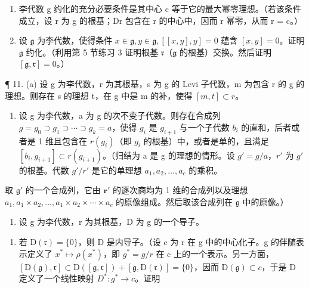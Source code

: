 \begin{enumerate}
\def\labelenumi{\arabic{enumi}.}
\setcounter{enumi}{8}
\item
  李代数 g 约化的充分必要条件是其中心 c 等于它的最大幂零理想。（若该条件成立，设 r 为 g 的根基；Dr 包含在 r 的中心中，因而 r 幂零，从而 r = c。）
\item
  设 \(\mathfrak{g}\) 为李代数，使得条件 \(x \in \mathfrak{g}, y \in \mathfrak{g}, [[x, y], y] = 0\) 蕴含 \([x, y] = 0\)。证明 \(\mathfrak{g}\) 约化。（利用第 5 节练习 3 证明根基 \(\mathfrak{r}\)（\(\mathfrak{g}\) 的根基）交换。然后证明 \([\mathfrak{g}, \mathfrak{r}] = 0\)。）
\end{enumerate}

¶ 11. (a) 设 g 为李代数，r 为其根基，s 为 g 的 Levi 子代数，m 为包含 r 的 g 的理想。则存在 s 的理想 t，在 g 中是 m 的补，使得 \([m, t] \subset r\)。

\begin{enumerate}
\def\labelenumi{(\alph{enumi})}
\setcounter{enumi}{1}
\tightlist
\item
  设 g 为李代数，a 为 g 的次不变子代数。则存在合成列 \(g = g_{0} \supset g_{1} \supset \cdots \supset g_{k} = a\)，使得 \(g_{i}\) 是 \(g_{i+1}\) 与一个子代数 \(b_{i}\) 的直和，后者或者是 1 维且包含在 \(r(g_{i})\)（即 \(g_{i}\) 的根基）中，或者是单的，且满足 \([b_{i}, g_{i+1}] \subset r(g_{i+1})\)。（归结为 a 是 g 的理想的情形。设 \(g' = g/a\)，\(r'\) 为 \(g'\) 的根基。代数 \(g'/r'\) 是它的单理想 \(a_{1}, a_{2}, \ldots, a_{c}\) 的乘积。
\end{enumerate}

取 \(\mathfrak{g}'\) 的一个合成列，它由 \(\mathbf{r}'\) 的逐次商均为 1 维的合成列以及理想 \(a_1, a_1 \times a_2, \ldots, a_1 \times a_2 \times \cdots \times a_c\) 的原像组成。然后取该合成列在 \(\mathfrak{g}\) 中的原像。）

\begin{enumerate}
\def\labelenumi{\arabic{enumi}.}
\setcounter{enumi}{11}
\tightlist
\item
  设 g 为李代数，r 为其根基，D 为 g 的一个导子。
\end{enumerate}

\begin{enumerate}
\def\labelenumi{(\alph{enumi})}
\tightlist
\item
  若 \(\mathrm{D}(\mathfrak{r}) = \{0\} \)，则 D 是内导子。（设 c 为 r 在 g 中的中心化子。g 的伴随表示定义了 \(x^{*} \mapsto \rho(x^{*})\)，即 \(g^{*} = g/r\) 在 c 上的一个表示。另一方面，\([\mathrm{D}(\mathfrak{g}), \mathfrak{r}] \subset \mathrm{D}([\mathfrak{g}, \mathfrak{r}]) + [\mathfrak{g}, \mathrm{D}(\mathfrak{r})] = \{0\}\)，因而 \(\mathrm{D}(\mathfrak{g}) \subset c\)，于是 D 定义了一个线性映射 \(D^{*}: g^{*} \to c\)。证明
\end{enumerate}

